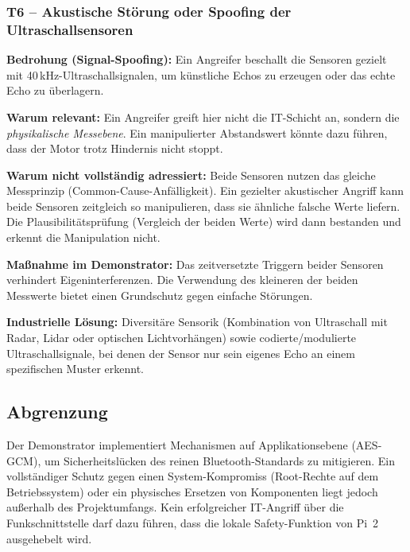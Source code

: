 \subsubsection*{T6 -- Akustische Störung oder Spoofing der Ultraschallsensoren}

\textbf{Bedrohung (Signal-Spoofing):} Ein Angreifer beschallt die Sensoren
gezielt mit 40\,kHz-Ultraschallsignalen, um künstliche Echos zu erzeugen oder
das echte Echo zu überlagern.

\textbf{Warum relevant:} Ein Angreifer greift hier nicht die IT-Schicht an,
sondern die \textit{physikalische Messebene}. Ein manipulierter
Abstandswert könnte dazu führen, dass der Motor trotz Hindernis nicht stoppt.

\textbf{Warum nicht vollständig adressiert:} Beide Sensoren nutzen das gleiche
Messprinzip (Common-Cause-Anfälligkeit). Ein gezielter akustischer Angriff kann beide Sensoren zeitgleich so manipulieren, dass
sie ähnliche falsche Werte liefern. Die Plausibilitätsprüfung (Vergleich der
beiden Werte) wird dann bestanden und erkennt die Manipulation nicht.

\textbf{Maßnahme im Demonstrator:} Das zeitversetzte Triggern beider Sensoren
verhindert Eigeninterferenzen. Die Verwendung des kleineren der beiden
Messwerte bietet einen Grundschutz gegen einfache Störungen.

\textbf{Industrielle Lösung:} Diversitäre Sensorik (Kombination von Ultraschall
mit Radar, Lidar oder optischen Lichtvorhängen) sowie codierte/modulierte
Ultraschallsignale, bei denen der Sensor nur sein eigenes Echo an einem
spezifischen Muster erkennt.

\subsection{Abgrenzung}
\label{subsec:security-abgrenzung}

Der Demonstrator implementiert Mechanismen auf Applikationsebene (AES-GCM), um
Sicherheitslücken des reinen Bluetooth-Standards zu mitigieren. Ein
vollständiger Schutz gegen einen System-Kompromiss (Root-Rechte auf dem
Betriebssystem) oder ein physisches Ersetzen von Komponenten liegt jedoch
außerhalb des Projektumfangs. Kein erfolgreicher IT-Angriff über die Funkschnittstelle darf dazu führen,
dass die lokale Safety-Funktion von Pi~2 ausgehebelt wird.
